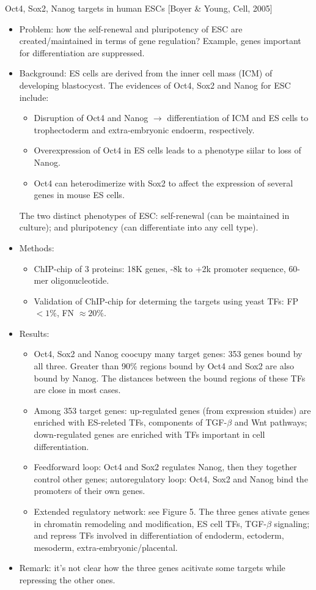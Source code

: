 \documentclass{report}
\begin{document}
Oct4, Sox2, Nanog targets in human ESCs [Boyer \& Young, Cell, 2005]
\begin{itemize}
\item Problem: how the self-renewal and pluripotency of ESC are created/maintained in terms of gene regulation? Example, genes important for differentiation are suppressed. 
	
	\item Background: ES cells are derived from the inner cell mass (ICM) of developing blastocycst. The evidences of Oct4, Sox2 and Nanog for ESC include: 
	\begin{itemize}
		\item Disruption of Oct4 and Nanog $\rightarrow$ differentiation of ICM and ES cells to trophectoderm and extra-embryonic endoerm, respectively. 
		\item Overexpression of Oct4 in ES cells leads to a phenotype siilar to loss of Nanog.
		\item Oct4 can heterodimerize with Sox2 to affect the expression of several genes in mouse ES cells. 
	\end{itemize}
	The two distinct phenotypes of ESC: self-renewal (can be maintained in culture); and pluripotency (can differentiate into any cell type). 
	
	\item Methods:
	\begin{itemize}
		\item ChIP-chip of 3 proteins: 18K genes, -8k to +2k promoter sequence, 60-mer oligonucleotide. 
		\item Validation of ChIP-chip for determing the targets using yeast TFs: FP $< 1\%$, FN $\approx 20\%$. 
	\end{itemize}
	
	\item Results:
	\begin{itemize}
		\item Oct4, Sox2 and Nanog coocupy many target genes: 353 genes bound by all three. Greater than 90\% regions bound by Oct4 and Sox2 are also bound by Nanog. The distances between the bound regions of these TFs are close in most cases. 
		\item Among 353 target genes: up-regulated genes (from expression stuides) are enriched with ES-releted TFs, components of TGF-$\beta$ and Wnt pathways; down-regulated genes are enriched with TFs important in cell differentiation. 
		\item Feedforward loop: Oct4 and Sox2 regulates Nanog, then they together control other genes; autoregulatory loop: Oct4, Sox2 and Nanog bind the promoters of their own genes. 
		\item Extended regulatory network: see Figure 5. The three genes ativate genes in chromatin remodeling and modification, ES cell TFs, TGF-$\beta$ signaling; and repress TFs involved in differentiation of endoderm, ectoderm, mesoderm, extra-embryonic/placental. 
	\end{itemize}
	
	\item Remark: it's not clear how the three genes acitivate some targets while repressing the other ones. 
\end{itemize}	
	
\end{document}
